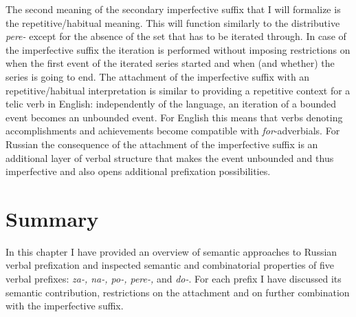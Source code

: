 
The second meaning of the secondary imperfective suffix that I will formalize is the repetitive/habitual meaning. This will function similarly to the distributive \textit{pere-} except for the absence of the set that has to be iterated through. In case of the imperfective suffix the iteration is performed without imposing restrictions on when the first event of the iterated series started and when (and whether) the series is going to end. The attachment of the imperfective suffix with an repetitive/habitual interpretation is similar to providing a repetitive context for a telic verb in English: independently of the language, an iteration of a bounded event becomes an unbounded event. For English this means that verbs denoting accomplishments and achievements become compatible with \textit{for}-adverbials. For Russian the consequence of the attachment of the imperfective suffix is an additional layer of verbal structure that makes the event unbounded and thus imperfective and also opens additional prefixation possibilities. 


\section{Summary}
In this chapter I have provided an overview of semantic approaches to Russian verbal prefixation and inspected semantic and combinatorial properties of five verbal prefixes: \textit{za-, na-, po-, pere-,} and \textit{do-}. For each prefix I have discussed its semantic contribution, restrictions on the attachment and on further combination with the imperfective suffix. 

